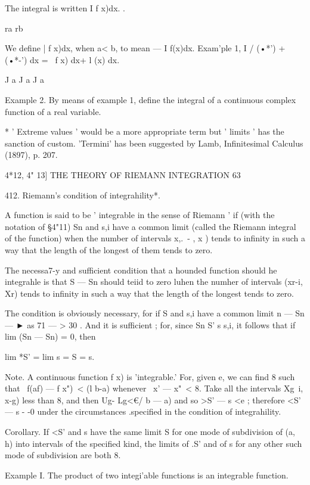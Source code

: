 The integral is written I f x)dx. . 

ra rb 

We define | f x)dx, when a< b, to mean — I f(x)dx. 
Exam'ple 1, I  / (•*') +   (•*-')  dx = \ f  x) dx+ l (x) dx. 

J a J a J a 

Example 2. By means of example 1, define the integral of a continuous complex 
function of a real variable. 

* ' Extreme values ' would be a more appropriate term but ' limits ' has the sanction of 
custom. 'Termini' has been suggested by Lamb, Infinitesimal Calculus (1897), p. 207. 



4*12, 4" 13] THE THEORY OF RIEMANN INTEGRATION 63 

412. Riemann's condition of integrahility*. 

A function is said to be ' integrable in the sense of Riemann ' if (with the 
notation of §4"11) Sn and s,i have a common limit (called the Riemann 
integral of the function) when the number of intervals  x,.\ - , x ) tends to 
infinity in such a way that the length of the longest of them tends to zero. 

The necessa7-y and sufficient condition that a hounded function should he 
integrahle is that S  — Sn should teiid to zero luhen the numher of intervals 
(xr-i, Xr) tends to infinity in such a way that the length of the longest tends 
to zero. 

The condition is obviously necessary, for if S  and s,i have a common limit 
 n — Sn — ► as 71 — > 30 . And it is sufficient ; for, since Sn S' s  s,i, it follows 
that if lim (Sn — Sn) = 0, then 

lim *S'  = lim s  = S = s. 

Note. A continuous function f x) is 'integrable.' For, given e, we can find 8 such 
that \ f(af) — f x")\ < (l b-a) whenever \ x' — x"\ < 8. Take all the intervals  Xg\ i, x-g) 
less than 8, and then Ug- Lg<€/ b — a) and so >S'  — s <e ; therefore <S'  — s - -0 under the 
circumstances .specified in the condition of integrahility. 

Corollary. If <S'  and s  have the same limit S for one mode of subdivision of (a, h) 
into intervals of the specified kind, the limits of .S'  and of s  for any other such mode of 
subdivision are both 8. 

Example I. The product of two integi'able functions is an integrable function. 

